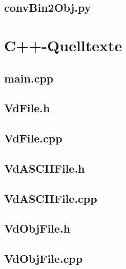 \documentclass[a4paper,12pt,bibliography=totoc, listof=totoc,titlepage,pointlessnumbers]{scrreprt}
\begin{document}
\begin{appendices}
\section{convBin2Obj.py}
\label{a:convBin2Obj.py}


\chapter{C++-Quelltexte}
\label{a:cpp}

\section{main.cpp}
\label{a:main.cpp}


\section{VdFile.h}
\label{a:VdFile.h}


\section{VdFile.cpp}
\label{a:VdFile.cpp}


\section{VdASCIIFile.h}
\label{a:VdASCIIFile.h}


\section{VdASCIIFile.cpp}
\label{a:VdASCIIFile.cpp}


\section{VdObjFile.h}
\label{a:VdObjFile.h}


\section{VdObjFile.cpp}
\label{a:VdObjFile.cpp}



\end{appendices}
\end{document}
